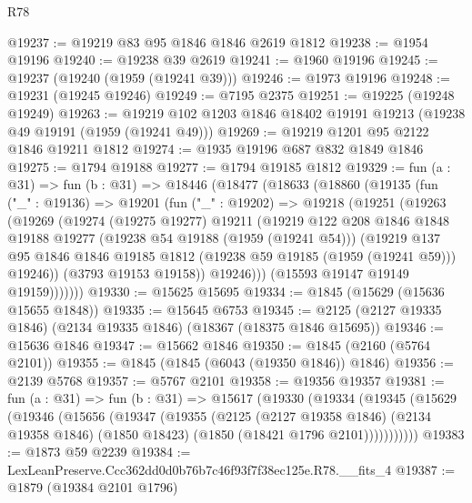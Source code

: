 \begin{lexlean}{R78}
\begin{coremodule}
@19237 := @19219 @83 @95 @1846 @1846 @2619 @1812
@19238 := @1954 @19196
@19240 := @19238 @39 @2619
@19241 := @1960 @19196
@19245 := @19237 (@19240 (@1959 (@19241 @39)))
@19246 := @1973 @19196
@19248 := @19231 (@19245 @19246)
@19249 := @7195 @2375
@19251 := @19225 (@19248 @19249)
@19263 := @19219 @102 @1203 @1846 @18402 @19191 @19213 (@19238 @49 @19191 (@1959 (@19241 @49)))
@19269 := @19219 @1201 @95 @2122 @1846 @19211 @1812
@19274 := @1935 @19196 @687 @832 @1849 @1846
@19275 := @1794 @19188
@19277 := @1794 @19185 @1812
@19329 := fun (a : @31) =>
  fun (b : @31) =>
  @18446
    (@18477
      (@18633
        (@18860
          (@19135
            (fun ("_" : @19136) =>
            @19201
              (fun ("_" : @19202) =>
              @19218
                (@19251
                  (@19263
                    (@19269
                      (@19274
                        (@19275 @19277)
                        @19211
                        (@19219
                          @122
                          @208
                          @1846
                          @1848
                          @19188
                          @19277
                          (@19238 @54 @19188 (@1959 (@19241 @54)))
                          (@19219
                            @137
                            @95
                            @1846
                            @1846
                            @19185
                            @1812
                            (@19238 @59 @19185 (@1959 (@19241 @59)))
                            @19246))
                        (@3793 @19153 @19158))
                      @19246)))
                (@15593 @19147 @19149 @19159)))))))
@19330 := @15625 @15695
@19334 := @1845 (@15629 (@15636 @15655 @1848))
@19335 := @15645 @6753
@19345 := @2125 (@2127 @19335 @1846) (@2134 @19335 @1846) (@18367 (@18375 @1846 @15695))
@19346 := @15636 @1846
@19347 := @15662 @1846
@19350 := @1845 (@2160 (@5764 @2101))
@19355 := @1845 (@1845 (@6043 (@19350 @1846)) @1846)
@19356 := @2139 @5768
@19357 := @5767 @2101
@19358 := @19356 @19357
@19381 := fun (a : @31) =>
  fun (b : @31) =>
  @15617
    (@19330
      (@19334
        (@19345
          (@15629
            (@19346
              (@15656
                (@19347
                  (@19355
                    (@2125
                      (@2127 @19358 @1846)
                      (@2134 @19358 @1846)
                      (@1850 @18423)
                      (@1850 (@18421 @1796 @2101)))))))))))
@19383 := @1873 @59 @2239
@19384 := LexLeanPreserve.Ccc362dd0d0b76b7c46f93f7f38ec125e.R78.__fits_4
@19387 := @1879 (@19384 @2101 @1796)

\end{coremodule}
\end{lexlean}
